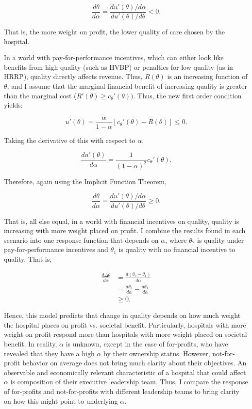 \documentclass[12pt]{article}
\begin{document}
    $$\frac{d\theta}{d\alpha} = \frac{du'(\theta)/d\alpha}{du'(\theta)/d\theta} < 0.$$

    \noindent That is, the more weight on profit, the lower quality of care chosen by the hospital.

    In a world with pay-for-performance incentives, which can either look like benefits from high quality (such as HVBP) or penalties for low quality (as in HRRP), quality directly affects revenue. Thus, $R(\theta)$ is an increasing function of $\theta$, and I assume that the marginal financial benefit of increasing quality is greater than the marginal cost ($R'(\theta)\geq c_{\theta}'(\theta))$. Thus, the new first order condition yields:

    $$u'(\theta) = \frac{\alpha}{1-\alpha} \left[c_{\theta}'(\theta)-R(\theta)\right] \leq 0.$$

    \noindent Taking the derivative of this with respect to $\alpha$,

    $$\frac{du'(\theta)}{d\alpha} = \frac{1}{(1-\alpha)^2}c_{\theta}'(\theta).$$

    Therefore, again using the Implicit Function Theorem,

    $$\frac{d\theta}{d\alpha} = \frac{du'(\theta)/d\alpha}{du'(\theta)/d\theta}\geq0.$$

    That is, all else equal, in a world with financial incentives on quality, quality is increasing with more weight placed on profit. I combine the results found in each scenario into one response function that depends on $\alpha$, where $\theta_2$ is quality under pay-for-performance incentives and $\theta_1$ is quality with no financial incentive to quality. That is, 

    \begin{align*}
        \frac{d\Delta\theta}{d\alpha}&=\frac{d(\theta_2-\theta_1)}{d\alpha}\\
        &=\frac{d\theta_2}{d\alpha}-\frac{d\theta_1}{d\alpha}\\
        &\geq 0.
    \end{align*}


    Hence, this model predicts that change in quality depends on how much weight the hospital places on profit vs. societal benefit. Particularly, hospitals with more weight on profit respond more than hospitals with more weight placed on societal benefit. In reality, $\alpha$ is unknown, except in the case of for-profits, who have revealed that they have a high $\alpha$ by their ownership status. However, not-for-profit behavior on average does not bring much clarity about their objectives. An observable and economically relevant characteristic of a hospital that could affect $\alpha$ is composition of their executive leadership team. Thus, I compare the response of for-profits and not-for-profits with different leadership teams to bring clarity on how this might point to underlying $\alpha$.
\end{document}
